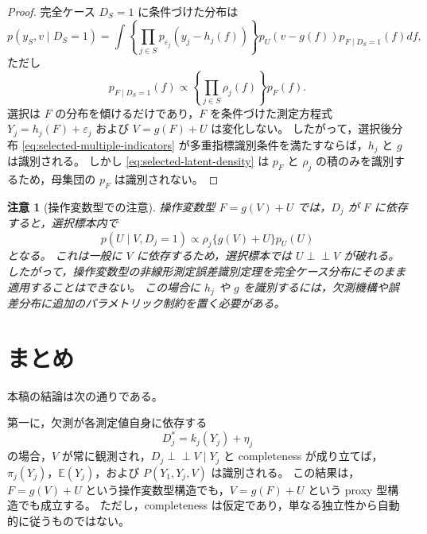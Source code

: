 \documentclass[dvipdfmx,autodetect-engine]{jsarticle}
\newtheorem{remark}{注意}
\newcommand{\indep}{\mathrel{\perp\!\!\!\perp}}
\newcommand{\E}{\mathbb{E}}
\newcommand{\1}{\mathbf{1}}
\begin{document}
\begin{proof}
完全ケース $D_S=1$ に条件づけた分布は
\begin{equation}
  p(y_S,v\mid D_S=1)
  = \int
      \left\{\prod_{j\in S}p_{\varepsilon_j}(y_j-h_j(f))\right\}
      p_U(v-g(f))
      p_{F\mid D_S=1}(f)
    df,
  \label{eq:selected-multiple-indicators}
\end{equation}
ただし
\begin{equation}
  p_{F\mid D_S=1}(f)
  \propto
  \left\{\prod_{j\in S}\rho_j(f)\right\}p_F(f).
  \label{eq:selected-latent-density}
\end{equation}
選択は $F$ の分布を傾けるだけであり，$F$ を条件づけた測定方程式
$Y_j=h_j(F)+\varepsilon_j$ および $V=g(F)+U$ は変化しない。
したがって，選択後分布 \eqref{eq:selected-multiple-indicators} が多重指標識別条件を満たすならば，$h_j$ と $g$ は識別される。
しかし \eqref{eq:selected-latent-density} は $p_F$ と $\rho_j$ の積のみを識別するため，母集団の $p_F$ は識別されない。
\end{proof}

\begin{remark}[操作変数型での注意]
操作変数型 $F=g(V)+U$ では，$D_j$ が $F$ に依存すると，選択標本内で
\begin{equation}
  p(U\mid V,D_j=1)
  \propto \rho_j\{g(V)+U\}p_U(U)
  \label{eq:selection-breaks-iv}
\end{equation}
となる。
これは一般に $V$ に依存するため，選択標本では $U\indep V$ が破れる。
したがって，操作変数型の非線形測定誤差識別定理を完全ケース分布にそのまま適用することはできない。
この場合に $h_j$ や $g$ を識別するには，欠測機構や誤差分布に追加のパラメトリック制約を置く必要がある。
\end{remark}

\section{まとめ}

本稿の結論は次の通りである。

第一に，欠測が各測定値自身に依存する
\begin{equation}
  D_j^*=k_j(Y_j)+\eta_j
\end{equation}
の場合，$V$ が常に観測され，$D_j\indep V\mid Y_j$ と completeness が成り立てば，$\pi_j(Y_j)$，$\E(Y_j)$，および $P(Y_1,Y_j,V)$ は識別される。
この結果は，$F=g(V)+U$ という操作変数型構造でも，$V=g(F)+U$ という proxy 型構造でも成立する。
ただし，completeness は仮定であり，単なる独立性から自動的に従うものではない。
\end{document}
